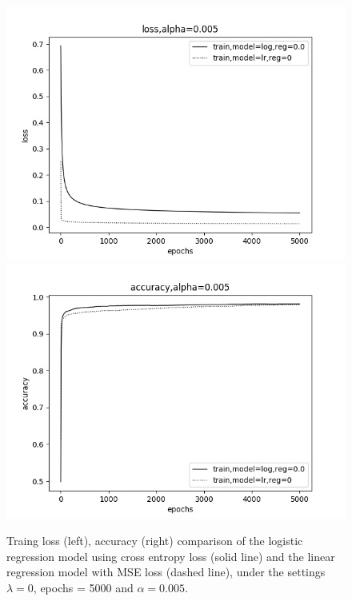 \documentclass[12pt]{article}
\newenvironment{problem}[2][Problem]{\begin{trivlist}
\item[\hskip \labelsep {\bfseries #1}\hskip \labelsep {\bfseries #2.}]}{\end{trivlist}}
\begin{document}
\begin{problem}{2}
\begin{figure}[!htb]
  \includegraphics[width=\linewidth]{images/a1/2.3/loss.png}
\endminipage\hfill
{}
  \includegraphics[width=\linewidth]{images/a1/2.3/accuracy.png}
\endminipage
\caption{Traing loss (left), accuracy (right) comparison of the logistic regression model using cross entropy loss (solid line) and the linear regression model with MSE loss (dashed line), under the settings $\lambda=0$, epochs = 5000 and $\alpha=0.005$.}\label{fig:2-3}
\end{figure}
  

\end{problem}
\end{document}
